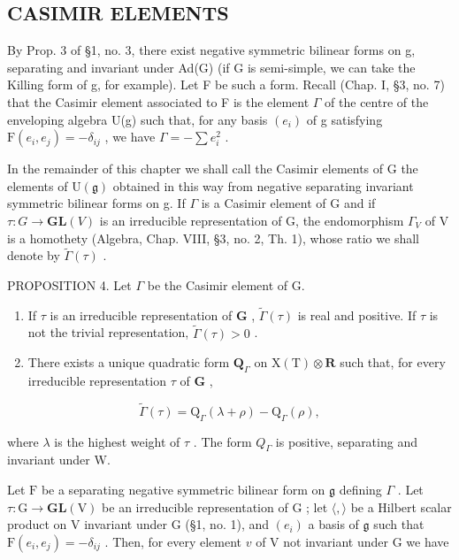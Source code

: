 \subsection{CASIMIR ELEMENTS}

By Prop. 3 of §1, no. 3, there exist negative symmetric bilinear forms on g, separating and invariant under Ad(G) (if G is semi-simple, we can take the Killing form of g, for example). Let F be such a form. Recall (Chap. I, §3, no. 7) that the Casimir element associated to F is the element \(\Gamma\) of the centre of the enveloping algebra U(g) such that, for any basis \((e_{i})\) of g satisfying \(\mathrm{F}(e_{i}, e_{j}) = -\delta_{ij}\) , we have \(\Gamma = -\sum e_{i}^{2}\) .

In the remainder of this chapter we shall call the Casimir elements of G the elements of \(\mathrm{U}(\mathfrak{g})\) obtained in this way from negative separating invariant symmetric bilinear forms on g. If \(\Gamma\) is a Casimir element of G and if \(\tau: G \to \mathbf{GL}(V)\) is an irreducible representation of G, the endomorphism \(\Gamma_{V}\) of V is a homothety (Algebra, Chap. VIII, §3, no. 2, Th. 1), whose ratio we shall denote by \(\tilde{\Gamma}(\tau)\) .

PROPOSITION 4. Let \(\Gamma\) be the Casimir element of G.

\begin{enumerate}
\def\labelenumi{\alph{enumi})}
\item
  If \(\tau\) is an irreducible representation of \(\mathbf{G}\) , \(\tilde{\Gamma}(\tau)\) is real and positive. If \(\tau\) is not the trivial representation, \(\tilde{\Gamma}(\tau) > 0\) .
\item
  There exists a unique quadratic form \(\mathbf{Q}_{\Gamma}\) on \(\mathrm{X(T)}\otimes \mathbf{R}\) such that, for every irreducible representation \(\tau\) of \(\mathbf{G}\) ,
\end{enumerate}

\[
\tilde {\Gamma} (\tau) = \mathrm{Q} _ {\Gamma} (\lambda + \rho) - \mathrm{Q} _ {\Gamma} (\rho),
\]

where \(\lambda\) is the highest weight of \(\tau\) . The form \(Q_{\Gamma}\) is positive, separating and invariant under W.

Let \(\mathrm{F}\) be a separating negative symmetric bilinear form on \(\mathfrak{g}\) defining \(\Gamma\) . Let \(\tau : \mathrm{G} \to \mathbf{GL}(\mathrm{V})\) be an irreducible representation of \(\mathrm{G}\) ; let \(\langle , \rangle\) be a Hilbert scalar product on \(\mathrm{V}\) invariant under \(\mathrm{G}\) (§1, no. 1), and \((e_i)\) a basis of \(\mathfrak{g}\) such that \(\mathrm{F}(e_i, e_j) = -\delta_{ij}\) . Then, for every element \(v\) of \(\mathrm{V}\) not invariant under \(\mathrm{G}\) we have

